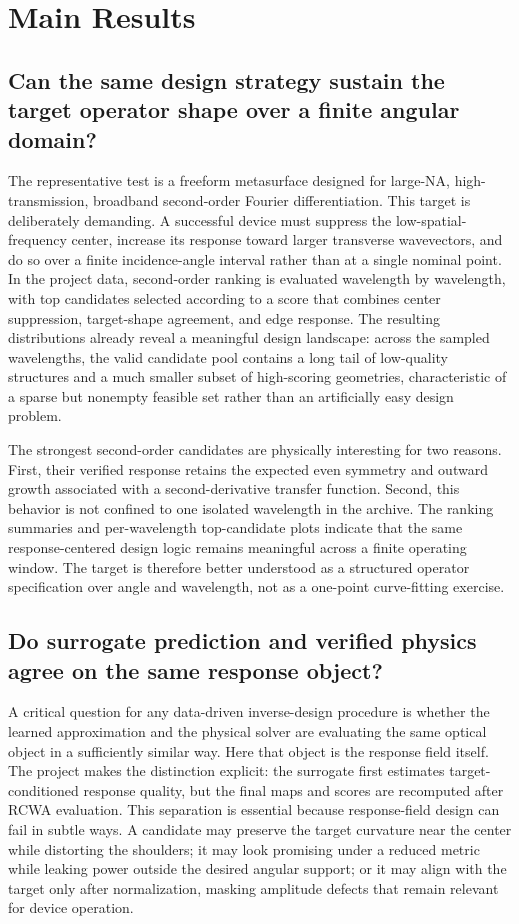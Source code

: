 \section{Main Results}

\subsection{Can the same design strategy sustain the target operator shape over a finite angular domain?}

The representative test is a freeform metasurface designed for large-NA, high-transmission, broadband second-order Fourier differentiation. This target is deliberately demanding. A successful device must suppress the low-spatial-frequency center, increase its response toward larger transverse wavevectors, and do so over a finite incidence-angle interval rather than at a single nominal point. In the project data, second-order ranking is evaluated wavelength by wavelength, with top candidates selected according to a score that combines center suppression, target-shape agreement, and edge response. The resulting distributions already reveal a meaningful design landscape: across the sampled wavelengths, the valid candidate pool contains a long tail of low-quality structures and a much smaller subset of high-scoring geometries, characteristic of a sparse but nonempty feasible set rather than an artificially easy design problem.

The strongest second-order candidates are physically interesting for two reasons. First, their verified response retains the expected even symmetry and outward growth associated with a second-derivative transfer function. Second, this behavior is not confined to one isolated wavelength in the archive. The ranking summaries and per-wavelength top-candidate plots indicate that the same response-centered design logic remains meaningful across a finite operating window. The target is therefore better understood as a structured operator specification over angle and wavelength, not as a one-point curve-fitting exercise.

\subsection{Do surrogate prediction and verified physics agree on the same response object?}

A critical question for any data-driven inverse-design procedure is whether the learned approximation and the physical solver are evaluating the same optical object in a sufficiently similar way. Here that object is the response field itself. The project makes the distinction explicit: the surrogate first estimates target-conditioned response quality, but the final maps and scores are recomputed after RCWA evaluation. This separation is essential because response-field design can fail in subtle ways. A candidate may preserve the target curvature near the center while distorting the shoulders; it may look promising under a reduced metric while leaking power outside the desired angular support; or it may align with the target only after normalization, masking amplitude defects that remain relevant for device operation.

